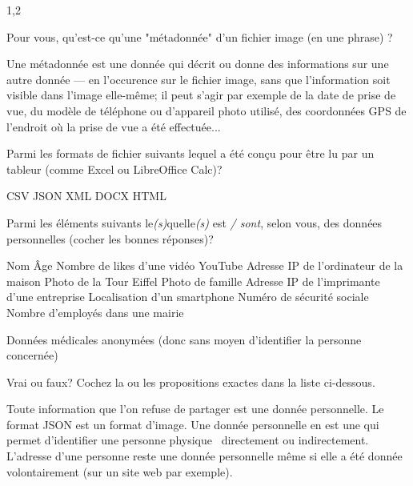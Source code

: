 \documentclass[11pt,a4paper]{exam}
\begin{document}
\begin{spacing}{1,2}
\begin{questions}
			\newpage
			
			\question[1] Pour vous, qu'est-ce qu'une "métadonnée" d'un fichier image (en une phrase) ?
			\begin{solution}
				Une métadonnée est une donnée qui décrit ou donne des informations sur une autre donnée --- en l'occurence sur le fichier image, sans que l'information soit visible dans l'image elle-même; il peut s'agir par exemple de la date de prise de vue, du modèle de téléphone ou d'appareil photo utilisé, des coordonnées GPS de l'endroit où la prise de vue a été effectuée...
			\end{solution}
			
			\question[1] Parmi les formats de fichier suivants lequel a été conçu
			pour être lu par un tableur (comme Excel ou LibreOffice Calc)?
			\begin{checkboxes}
				\correctchoice CSV
				\choice JSON
				\choice XML
				\choice DOCX
				\choice HTML
			\end{checkboxes}
			\addpoints
			
			\question[2] Parmi les éléments suivants le\textit{(s)}quelle\textit{(s)}
			est \textit{/ sont}, selon vous, des données personnelles (cocher les bonnes réponses)?
			\addpoints
			\begin{checkboxes}
				\correctchoice Nom
				\choice Âge
				\choice Nombre de likes d'une vidéo YouTube
				\correctchoice Adresse IP de l'ordinateur de la maison
				\choice Photo de la Tour Eiffel
				\correctchoice Photo de famille
				\choice Adresse IP de l'imprimante d'une entreprise
				\correctchoice Localisation d'un smartphone
				\correctchoice Numéro de sécurité sociale
				\choice Nombre d'employés dans une mairie
				
				\choice Données médicales anonymées (donc sans moyen d'identifier la personne concernée)
			\end{checkboxes}
			
			\question[2] Vrai ou faux? Cochez la ou les propositions exactes dans la liste ci-dessous.
			\begin{checkboxes}
				\choice Toute information que l'on refuse de partager est une donnée personnelle.
				\choice Le format JSON est un format d'image.
				\correctchoice Une donnée personnelle en est une qui permet d'identifier une personne
				physique \textemdash\ directement ou indirectement.
				\correctchoice L’adresse d’une personne reste une donnée personnelle même si elle
				a été donnée volontairement (sur un site web par exemple).
			\end{checkboxes}
			
			
		\end{questions}
	\end{spacing}
	
\end{document}
